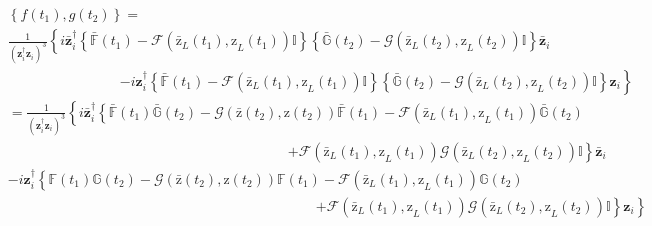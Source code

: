 \documentclass[aps,preprint]{revtex4}%
\begin{document}
\begin{align}
&  \left\{  f\left(  t_{1}\right)  ,g\left(  t_{2}\right)  \right\}
=\nonumber\\
&  \frac{1}{\left(  \mathbf{z}_{i}^{\dagger}\mathbf{z}_{i}\right)  ^{3}%
}\left\{  i\mathbf{\bar{z}}_{i}^{\dagger}\left\{  \mathbb{\bar{F}}\left(
t_{1}\right)  -\mathcal{F}\left(  \mathrm{\bar{z}}_{L}\left(  t_{1}\right)
\mathrm{,z}_{L}\left(  t_{1}\right)  \right)  \mathbb{I}\right\}  \left\{
\mathbb{\bar{G}}\left(  t_{2}\right)  -\mathcal{G}\left(  \mathrm{\bar{z}}%
_{L}\left(  t_{2}\right)  \mathrm{,z}_{L}\left(  t_{2}\right)  \right)
\mathbb{I}\right\}  \mathbf{\bar{z}}_{i}\right.  \nonumber\\
&  \qquad\qquad\qquad\qquad\left.  -i\mathbf{z}_{i}^{\dagger}\left\{
\mathbb{\bar{F}}\left(  t_{1}\right)  -\mathcal{F}\left(  \mathrm{\bar{z}}%
_{L}\left(  t_{1}\right)  \mathrm{,z}_{L}\left(  t_{1}\right)  \right)
\mathbb{I}\right\}  \left\{  \mathbb{\bar{G}}\left(  t_{2}\right)
-\mathcal{G}\left(  \mathrm{\bar{z}}_{L}\left(  t_{2}\right)  \mathrm{,z}%
_{L}\left(  t_{2}\right)  \right)  \mathbb{I}\right\}  \mathbf{z}_{i}\right\}
\nonumber\\
&  =\frac{1}{\left(  \mathbf{z}_{i}^{\dagger}\mathbf{z}_{i}\right)  ^{3}%
}\left\{  i\mathbf{\bar{z}}_{i}^{\dagger}\left\{  \mathbb{\bar{F}}\left(
t_{1}\right)  \mathbb{\bar{G}}\left(  t_{2}\right)  -\mathcal{G}\left(
\mathrm{\bar{z}}\left(  t_{2}\right)  \mathrm{,z}\left(  t_{2}\right)
\right)  \mathbb{\bar{F}}\left(  t_{1}\right)  -\mathcal{F}\left(
\mathrm{\bar{z}}_{L}\left(  t_{1}\right)  \mathrm{,z}_{L}\left(  t_{1}\right)
\right)  \mathbb{\bar{G}}\left(  t_{2}\right)  \right.  \right.  \nonumber\\
&  \qquad\qquad\qquad\qquad\qquad\qquad\qquad\qquad\qquad\qquad\left.
+\mathcal{F}\left(  \mathrm{\bar{z}}_{L}\left(  t_{1}\right)  \mathrm{,z}%
_{L}\left(  t_{1}\right)  \right)  \mathcal{G}\left(  \mathrm{\bar{z}}%
_{L}\left(  t_{2}\right)  \mathrm{,z}_{L}\left(  t_{2}\right)  \right)
\mathbb{I}\right\}  \mathbf{\bar{z}}_{i}\nonumber\\
&  -i\mathbf{z}_{i}^{\dagger}\left\{  \mathbb{F}\left(  t_{1}\right)
\mathbb{G}\left(  t_{2}\right)  -\mathcal{G}\left(  \mathrm{\bar{z}}\left(
t_{2}\right)  \mathrm{,z}\left(  t_{2}\right)  \right)  \mathbb{F}\left(
t_{1}\right)  -\mathcal{F}\left(  \mathrm{\bar{z}}_{L}\left(  t_{1}\right)
\mathrm{,z}_{L}\left(  t_{1}\right)  \right)  \mathbb{G}\left(  t_{2}\right)
\right.  \nonumber\\
&  \qquad\qquad\qquad\qquad\qquad\qquad\qquad\qquad\qquad\qquad\qquad\left.
\left.  +\mathcal{F}\left(  \mathrm{\bar{z}}_{L}\left(  t_{1}\right)
\mathrm{,z}_{L}\left(  t_{1}\right)  \right)  \mathcal{G}\left(
\mathrm{\bar{z}}_{L}\left(  t_{2}\right)  \mathrm{,z}_{L}\left(  t_{2}\right)
\right)  \mathbb{I}\right\}  \mathbf{z}_{i}\right\}
\end{align}
\end{document}
